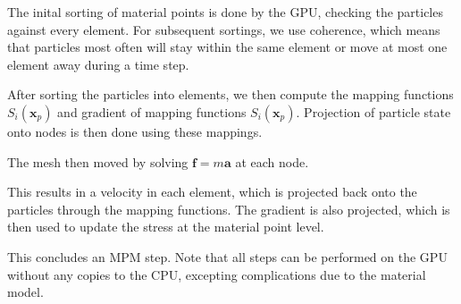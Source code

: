 \documentclass[10pt]{article}
\begin{document}
The inital sorting of material points is done by the GPU, checking the particles against every element.
For subsequent sortings, we use coherence, which means that particles most often will stay within the same element or move at most one element away during a time step.

After sorting the particles into elements, we then compute the mapping functions $S_{i}(\mathbf{x}_p)$ and gradient of mapping functions $S_{i}(\mathbf{x}_p)$.
Projection of particle state onto nodes is then done using these mappings.

The mesh then moved by solving $\mathbf{f} = m \mathbf{a}$ at each node.

This results in a velocity in each element, which is projected back onto the particles through the mapping functions.
The gradient is also projected, which is then used to update the stress at the material point level.

This concludes an MPM step.
Note that all steps can be performed on the GPU without any copies to the CPU, excepting complications due to the material model.

\printbibliography
\end{document}

